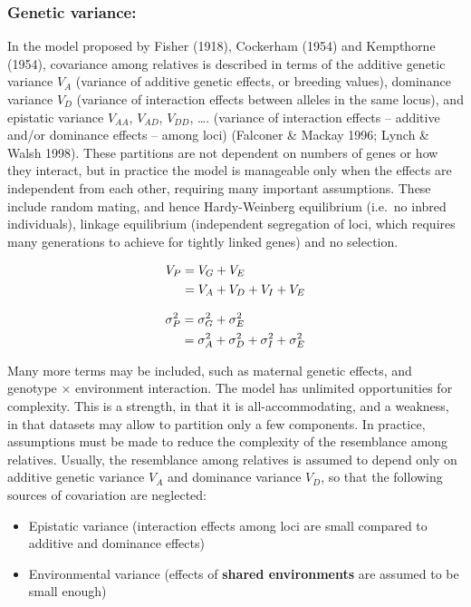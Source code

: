 \documentclass[
]{book}
\providecommand{\tightlist}{%
  \setlength{\itemsep}{0pt}\setlength{\parskip}{0pt}}
\begin{document}
\hypertarget{genetic-variance}{%
\subsubsection{Genetic variance:}\label{genetic-variance}}

In the model proposed by Fisher (1918), Cockerham (1954) and Kempthorne (1954), covariance among relatives is described in terms of the additive genetic variance \(V_{A}\) (variance of additive genetic effects, or breeding values), dominance variance \(V_{D}\) (variance of interaction effects between alleles in the same locus), and epistatic variance \(V_{AA}\), \(V_{AD}\), \(V_{DD}\), \ldots. (variance of interaction effects -- additive and/or dominance effects -- among loci) (Falconer \& Mackay 1996; Lynch \& Walsh 1998). These partitions are not dependent on numbers of genes or how they interact, but in practice the model is manageable only when the effects are independent from each other, requiring many important assumptions. These include random mating, and hence Hardy-Weinberg equilibrium (i.e.~no inbred individuals), linkage equilibrium (independent segregation of loci, which requires many generations to achieve for tightly linked genes) and no selection.

\begin{align}
V_{P} &= V_{G} + V_{E} \notag \\
      &= V_{A} + V_{D} + V_{I} + V_{E}
\end{align}

\begin{align}
\sigma^2_{P} &= \sigma^2_{G} + \sigma^2_{E}  \notag \\
             &= \sigma^2_{A} + \sigma^2_{D} + \sigma^2_{I} + \sigma^2_{E}
\end{align}

Many more terms may be included, such as maternal genetic effects, and genotype × environment interaction. The model has unlimited opportunities for complexity. This is a strength, in that it is all-accommodating, and a weakness, in that datasets may allow to partition only a few components. In practice, assumptions must be made to reduce the complexity of the resemblance among relatives. Usually, the resemblance among relatives is assumed to depend only on additive genetic variance \(V_{A}\) and dominance variance \(V_{D}\), so that the following sources of covariation are neglected:

\begin{itemize}
\tightlist
\item
  Epistatic variance (interaction effects among loci are small compared to additive and dominance effects)
\item
  Environmental variance (effects of \textbf{shared environments} are assumed to be small enough)
\end{itemize}
\end{document}
